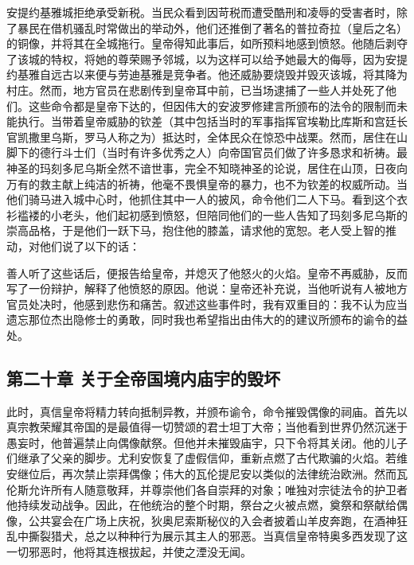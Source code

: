 安提约基雅城拒绝承受新税。当民众看到因苛税而遭受酷刑和凌辱的受害者时，除了暴民在借机骚乱时常做出的举动外，他们还推倒了著名的普拉奇拉（皇后之名）的铜像，并将其在全城拖行。皇帝得知此事后，如所预料地感到愤怒。他随后剥夺了该城的特权，将她的尊荣赐予邻城，以为这样可以给予她最大的侮辱，因为安提约基雅自远古以来便与劳迪基雅是竞争者。他还威胁要烧毁并毁灭该城，将其降为村庄。然而，地方官员在悲剧传到皇帝耳中前，已当场逮捕了一些人并处死了他们。这些命令都是皇帝下达的，但因伟大的安波罗修建言所颁布的法令的限制而未能执行。当带着皇帝威胁的钦差（其中包括当时的军事指挥官埃勒比库斯和宫廷长官凯撒里乌斯，罗马人称之为）抵达时，全体民众在惊恐中战栗。然而，居住在山脚下的德行斗士们（当时有许多优秀之人）向帝国官员们做了许多恳求和祈祷。最神圣的玛刻多尼乌斯全然不谙世事，完全不知晓神圣的论说，居住在山顶，日夜向万有的救主献上纯洁的祈祷，他毫不畏惧皇帝的暴力，也不为钦差的权威所动。当他们骑马进入城中心时，他抓住其中一人的披风，命令他们二人下马。看到这个衣衫褴褛的小老头，他们起初感到愤怒，但陪同他们的一些人告知了玛刻多尼乌斯的崇高品格，于是他们一跃下马，抱住他的膝盖，请求他的宽恕。老人受上智的推动，对他们说了以下的话：\par

善人听了这些话后，便报告给皇帝，并熄灭了他怒火的火焰。皇帝不再威胁，反而写了一份辩护，解释了他愤怒的原因。他说：皇帝还补充说，当他听说有人被地方官员处决时，他感到悲伤和痛苦。叙述这些事件时，我有双重目的：我不认为应当遗忘那位杰出隐修士的勇敢，同时我也希望指出由伟大的的建议所颁布的谕令的益处。\par


\subsection{第二十章 关于全帝国境内庙宇的毁坏}

此时，真信皇帝将精力转向抵制异教，并颁布谕令，命令摧毁偶像的祠庙。首先以真宗教荣耀其帝国的是最值得一切赞颂的君士坦丁大帝；当他看到世界仍然沉迷于愚妄时，他普遍禁止向偶像献祭。但他并未摧毁庙宇，只下令将其关闭。他的儿子们继承了父亲的脚步。尤利安恢复了虚假信仰，重新点燃了古代欺骗的火焰。若维安继位后，再次禁止崇拜偶像；伟大的瓦伦提尼安以类似的法律统治欧洲。然而瓦伦斯允许所有人随意敬拜，并尊崇他们各自崇拜的对象；唯独对宗徒法令的护卫者他持续发动战争。因此，在他统治的整个时期，祭台之火被点燃，奠祭和祭献给偶像，公共宴会在广场上庆祝，狄奥尼索斯秘仪的入会者披着山羊皮奔跑，在酒神狂乱中撕裂猎犬，总之以种种行为展示其主人的邪恶。当真信皇帝特奥多西发现了这一切邪恶时，他将其连根拔起，并使之湮没无闻。\par

